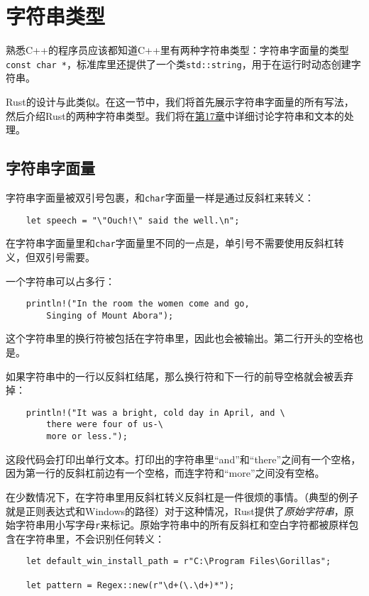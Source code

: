 \section{字符串类型}\label{string}

熟悉C++的程序员应该都知道C++里有两种字符串类型：字符串字面量的类型\texttt{const char *}，标准库里还提供了一个类\texttt{std::string}，用于在运行时动态创建字符串。

Rust的设计与此类似。在这一节中，我们将首先展示字符串字面量的所有写法，然后介绍Rust的两种字符串类型。我们将在\hyperref[ch17]{第17章}中详细讨论字符串和文本的处理。

\subsection{字符串字面量}\label{StrLiteral}

字符串字面量被双引号包裹，和\texttt{char}字面量一样是通过反斜杠来转义：
\begin{verbatim}
    let speech = "\"Ouch!\" said the well.\n";
\end{verbatim}

在字符串字面量里和\texttt{char}字面量里不同的一点是，单引号不需要使用反斜杠转义，但双引号需要。

一个字符串可以占多行：
\begin{verbatim}
    println!("In the room the women come and go,
        Singing of Mount Abora");
\end{verbatim}
这个字符串里的换行符被包括在字符串里，因此也会被输出。第二行开头的空格也是。


如果字符串中的一行以反斜杠结尾，那么换行符和下一行的前导空格就会被丢弃掉：
\begin{verbatim}
    println!("It was a bright, cold day in April, and \
        there were four of us-\
        more or less.");
\end{verbatim}
这段代码会打印出单行文本。打印出的字符串里“and”和“there”之间有一个空格，因为第一行的反斜杠前边有一个空格，而连字符和“more”之间没有空格。

在少数情况下，在字符串里用反斜杠转义反斜杠是一件很烦的事情。（典型的例子就是正则表达式和Windows的路径）对于这种情况，Rust提供了\emph{原始字符串}，原始字符串用小写字母\texttt{r}来标记。原始字符串中的所有反斜杠和空白字符都被原样包含在字符串里，不会识别任何转义：
\begin{verbatim}
    let default_win_install_path = r"C:\Program Files\Gorillas";

    let pattern = Regex::new(r"\d+(\.\d+)*");
\end{verbatim}

